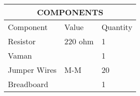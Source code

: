 	\begin{center}
\begin{tabular}{|p{5cm}|p{3cm}|p{2cm}|}
	\hline
	\multicolumn{3}{|c|}{COMPONENTS}\\
	\hline
	Component& Value& Quantity\\
	\hline
	Resistor& 220 ohm& 1\\
	\hline
	Vaman& & 1\\
	\hline
	Jumper Wires& M-M& 20\\
	\hline
	Breadboard& & 1\\
	\hline
\end{tabular}
	\end{center}
